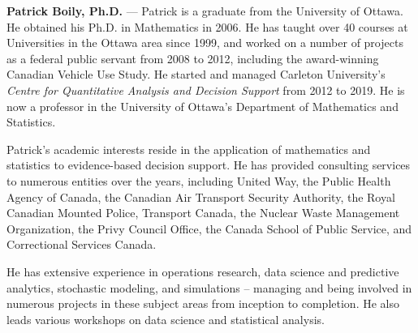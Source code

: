 \textbf{Patrick Boily, Ph.D.} — Patrick is a graduate from the University of Ottawa. He obtained his Ph.D. in Mathematics in 2006. He has taught over 40 courses at Universities in the Ottawa area since 1999, and worked on a number of projects as a federal public servant from 2008 to 2012, including the award-winning Canadian Vehicle Use Study. He started and managed Carleton University’s \textit{Centre for Quantitative Analysis and Decision Support} from 2012 to 2019. He is now a professor in the University of Ottawa’s Department of Mathematics and Statistics. \par Patrick’s academic interests reside in the application of mathematics and statistics to evidence-based decision support. He has provided consulting services to numerous entities over the years, including United Way, the Public Health Agency of Canada, the Canadian Air Transport Security Authority, the Royal Canadian Mounted Police, Transport Canada, the Nuclear Waste Management Organization, the Privy Council Office, the Canada School of Public Service, and Correctional Services Canada. \par He has extensive experience in operations research, data science and predictive analytics, stochastic modeling, and simulations – managing and being involved in numerous projects in these subject areas from inception to completion. He also leads various workshops on data science and statistical analysis.